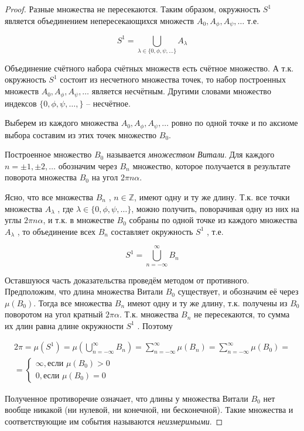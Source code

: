 \begin{proof}
Разные множества не пересекаются. Таким образом, окружность $S^1$ является объединением непересекающихся множеств $A_0, A_\phi, A_\psi , \ldots $ т.е.

\begin{equation*}
	S^1=\bigcup\limits_{\lambda\in\{0,\phi,\psi,\ldots\}}A_\lambda
\end{equation*}

Объединение счётного набора счётных множеств есть счётное множество.
А т.к. окружность $S^1$ состоит из несчетного множества точек, то набор построенных множеств $A_0, A_\phi, A_\psi , \ldots $ является несчётным. Другими словами
множество индексов $\{0, \phi, \psi, \ldots ,\}$ -- несчётное.

Выберем из каждого множества $A_0, A_\phi, A_\psi , \ldots $ ровно по одной точке и по аксиоме выбора составим из этих точек множество $B_0$. 

Построенное множество $B_0$ называется \textit{множеством Витали}. Для каждого $n=\pm1, \pm2, \ldots$ обозначим через $B_n$ множество, которое получается в результате поворота множества $B_0$ на угол $2\pi n\alpha$. 

Ясно, что все множества $B_n$ , $n\in \mathbb{Z}$, имеют одну и ту же длину. Т.к. все точки множества $A_\lambda$ , где $\lambda \in \{0, \phi, \psi, \ldots\}$, можно получить, поворачивая одну из них на углы $2\pi n\alpha$, и т.к. в множестве $B_0$ собраны по одной точке из каждого множества $A_\lambda$ , то объединение всех $B_n$ составляет окружность $S^1$ , т.е.

\begin{equation*}
	S^1=\bigcup\limits_{n=-\infty}^{\infty}B_n
\end{equation*}

Оставшуюся часть доказательства проведём методом от противного. Предположим, что длина множества Витали $B_0$ существует, и обозначим её через $\mu(B_0)$. Тогда все множества $B_n$ имеют одну и ту же длину, т.к. получены из $B_0$ поворотом на угол кратный $2\pi\alpha$. Т.к. множества $B_n$ не пересекаются, то сумма их длин равна длине окружности $S^1$ . Поэтому

\begin{gather*}
	2\pi=\mu(S^1)=\mu\left(\bigcup\limits_{n=-\infty}^{\infty}B_n\right)=\sum\limits_{n=-\infty}^{\infty}\mu(B_n)=
	\sum\limits_{n=-\infty}^{\infty}\mu(B_0)=\\
	=
	\left\{
		\begin{aligned}
			\infty, \text{если } \mu(B_0)>0\\
			0, \text{если } \mu(B_0)=0
		\end{aligned}
	\right.
\end{gather*}

Полученное противоречие означает, что длины у множества Витали $B_0$
нет вообще никакой (ни нулевой, ни конечной, ни бесконечной). Такие множества и соответствующие им события называются \textit{неизмеримыми}.
\end{proof}
